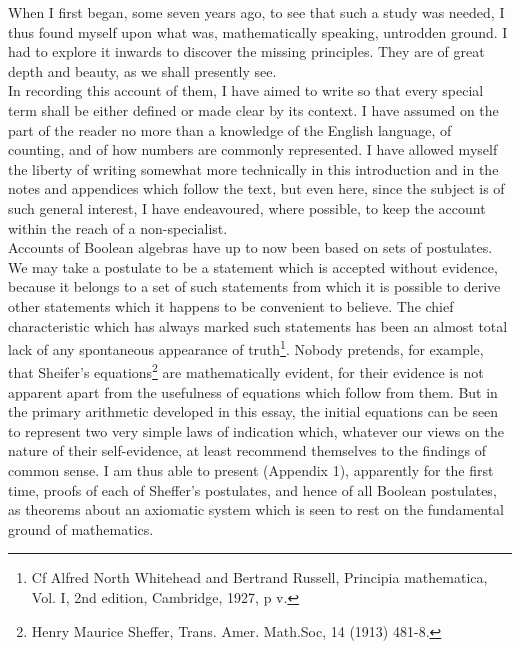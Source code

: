 \documentclass[a4paper]{article}
\theoremstyle{remark}
\begin{document}
When  I  first  began,  some  seven  years  ago,  to  see  that  such  a   study   was   needed,   I   thus   found   myself   upon   what   was,   mathematically  speaking,  untrodden  ground.  I  had  to  explore  it  inwards  to  discover  the  missing  principles.  They  are  of  great  depth  and  beauty,  as  we  shall  presently  see.\\

In  recording  this  account   of  them,   I  have  aimed  to   write   so  that  every  special  term  shall  be  either  defined  or  made  clear  by  its  context.  I  have  assumed  on  the  part  of  the  reader  no  more  than  a  knowledge  of  the  English  language,  of  counting,  and  of how  numbers  are commonly  represented.  I have  allowed  myself  the  liberty  of  writing  somewhat  more  technically  in  this  introduction  and  in  the  notes  and  appendices  which  follow  the  text,  but  even  here,  since  the  subject  is  of  such  general  interest,  I  have  endeavoured,  where possible,  to  keep the account  within  the  reach  of  a  non-specialist.\\

Accounts  of  Boolean  algebras  have  up  to  now  been  based  on  sets  of  postulates.  We  may  take  a  postulate  to  be  a  statement which is accepted without evidence, because it belongs to  a set of such  statements  from  which  it  is  possible  to  derive  other  statements  which  it  happens  to  be  convenient  to  believe.  The  chief  characteristic which has always marked  such statements has  been  an  almost  total  lack  of  any  spontaneous  appearance  of  truth\footnote{Cf Alfred North Whitehead and Bertrand Russell, Principia mathematica, Vol. I, 2nd edition,  Cambridge, 1927, p v.}.  Nobody  pretends,  for   example,  that  Sheifer's  equations\footnote{Henry  Maurice  Sheffer, Trans. Amer.   Math.Soc, 14 (1913) 481-8.}   are   mathematically  evident, for  their  evidence  is not  apparent  apart  from  the usefulness  of equations which follow from  them.  But in the primary  arithmetic  developed  in  this  essay,  the  initial  equations can be seen to  represent two very  simple  laws  of  indication  which,  whatever  our  views  on  the  nature  of  their  self-evidence,  at   least  recommend   themselves   to   the   findings   of   common   sense.  I  am  thus  able  to  present  (Appendix  1), apparently   for   the  first  time,  proofs  of  each  of  Sheffer's  postulates,  and  hence  of   all   Boolean   postulates,   as  theorems   about   an   axiomatic   system  which  is  seen  to  rest  on  the  fundamental   ground   of   mathematics.\\
\end{document}
